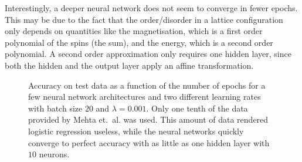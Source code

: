 \documentclass[11pt,british,a4paper]{article}
\numberwithin{equation}{section}
\begin{document}
Interestingly, a deeper neural network does not seem to converge in fewer epochs. This may be due to the fact that the order/disorder in a lattice configuration only depends on quantities like the magnetisation, which is a first order polynomial of the spins (the sum), and the energy, which is a second order polynomial. A second order approximation only requires one hidden layer, since both the hidden and the output layer apply an affine transformation.
\begin{figure}[H]
    \centering
    \caption{Accuracy on test data as a function of the number of epochs for a few neural network architectures and two different learning rates with batch size \(20\) and \(\lambda=\num{0.001}\). Only one tenth of the data provided by Mehta et.\ al.\cite{mehta} was used. This amount of data rendered logistic regression useless, while the neural networks quickly converge to perfect accuracy with as little as one hidden layer with \(10\) neurons.}\label{fig:nnclass}
\end{figure}

\end{document}
